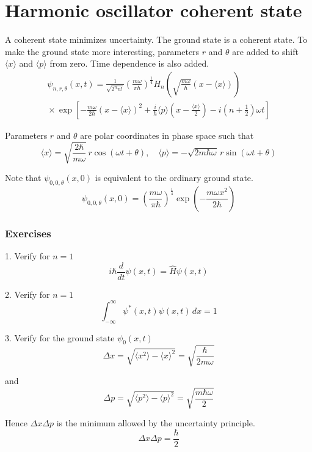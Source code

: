 

\section*{Harmonic oscillator coherent state}

A coherent state minimizes uncertainty.
The ground state is a coherent state.
To make the ground state more interesting, parameters $r$ and $\theta$ are added
to shift $\langle x\rangle$ and $\langle p\rangle$ from zero.
Time dependence is also added.
\begin{multline*}
\psi_{n,r,\theta}(x,t)
=\frac{1}{\sqrt{2^nn!}}
\left(\frac{m\omega}{\pi\hbar}\right)^\frac{1}{4}
H_n\left(\sqrt{\frac{m\omega}{\hbar}}\left(x-\langle x\rangle\right)\right)
\\{}\times
\exp\left[
-\frac{m\omega}{2\hbar}\left(x-\langle x\rangle\right)^2
+\frac{i}{\hbar}\langle p\rangle\left(x-\frac{\langle x\rangle}{2}\right)
-i\left(n+\frac{1}{2}\right)\omega t
\right]
\end{multline*}

Parameters $r$ and $\theta$ are polar coordinates in phase space such that
\begin{equation*}
\langle x\rangle=\sqrt{\frac{2\hbar}{m\omega}}\,r\cos(\omega t+\theta),\quad
\langle p\rangle=-\sqrt{2m\hbar\omega}\,r\sin(\omega t+\theta)
\end{equation*}

Note that $\psi_{0,0,\theta}(x,0)$ is equivalent to the ordinary ground state.
\begin{equation*}
\psi_{0,0,\theta}(x,0)=\left(\frac{m\omega}{\pi\hbar}\right)^\frac{1}{4}
\exp\left(-\frac{m\omega x^2}{2\hbar}\right)
\end{equation*}

\subsubsection*{Exercises}

1. Verify for $n=1$
\begin{equation*}
i\hbar\frac{d}{dt}\psi(x,t)=\hat H\psi(x,t)
\end{equation*}

2. Verify for $n=1$
\begin{equation*}
\int_{-\infty}^\infty\psi^*(x,t)\psi(x,t)\,dx=1
\end{equation*}

3. Verify for the ground state $\psi_0(x,t)$
\begin{equation*}
\Delta x=\sqrt{\langle x^2\rangle-\langle x\rangle^2}
=\sqrt{\frac{\hbar}{2m\omega}}
\end{equation*}

and
\begin{equation*}
\Delta p=\sqrt{\langle p^2\rangle-\langle p\rangle^2}
=\sqrt{\frac{m\hbar\omega}{2}}
\end{equation*}

Hence $\Delta x\Delta p$ is the minimum allowed by the uncertainty principle.
\begin{equation*}
\Delta x\Delta p=\frac{\hbar}{2}
\end{equation*}


